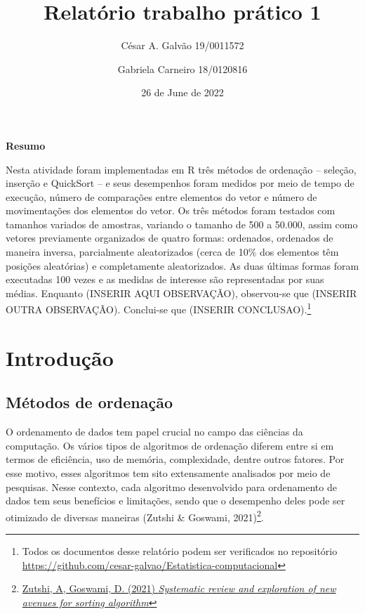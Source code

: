 \documentclass[
]{article}
\title{Relatório trabalho prático 1}
\author{César A. Galvão 19/0011572 \and Gabriela Carneiro 18/0120816}
\date{26 de June de 2022}
\begin{document}
\maketitle

\newpage{}

{
\setcounter{tocdepth}{2}
\tableofcontents
}
\let\oldsection\section
\renewcommand\section{\clearpage\oldsection}

\begin{center} 

\textbf{Resumo} 

\end{center}

Nesta atividade foram implementadas em R três métodos de ordenação --
seleção, inserção e QuickSort -- e seus desempenhos foram medidos por
meio de tempo de execução, número de comparações entre elementos do
vetor e número de movimentações dos elementos do vetor. Os três métodos
foram testados com tamanhos variados de amostras, variando o tamanho de
500 a 50.000, assim como vetores previamente organizados de quatro
formas: ordenados, ordenados de maneira inversa, parcialmente
aleatorizados (cerca de 10\% dos elementos têm posições aleatórias) e
completamente aleatorizados. As duas últimas formas foram executadas 100
vezes e as medidas de interesse são representadas por suas médias.
Enquanto (INSERIR AQUI OBSERVAÇÃO), observou-se que (INSERIR OUTRA
OBSERVAÇÃO). Conclui-se que (INSERIR CONCLUSAO).\footnote{Todos os
  documentos desse relatório podem ser verificados no repositório
  \url{https://github.com/cesar-galvao/Estatistica-computacional}}

\hypertarget{introduuxe7uxe3o}{%
\section{Introdução}\label{introduuxe7uxe3o}}

\hypertarget{muxe9todos-de-ordenauxe7uxe3o}{%
\subsection{Métodos de ordenação}\label{muxe9todos-de-ordenauxe7uxe3o}}

O ordenamento de dados tem papel crucial no campo das ciências da
computação. Os vários tipos de algoritmos de ordenação diferem entre si
em termos de eficiência, uso de memória, complexidade, dentre outros
fatores. Por esse motivo, esses algoritmos tem sito extensamente
analisados por meio de pesquisas. Nesse contexto, cada algoritmo
desenvolvido para ordenamento de dados tem seus benefícios e limitações,
sendo que o desempenho deles pode ser otimizado de diversas maneiras
(Zutshi \& Goswami, 2021)\footnote{\href{https://www.sciencedirect.com/science/article/pii/S2667096821000355}{Zutshi,
  A, Goswami, D. (2021) \emph{Systematic review and exploration of new
  avenues for sorting algorithm}}}.
\end{document}
